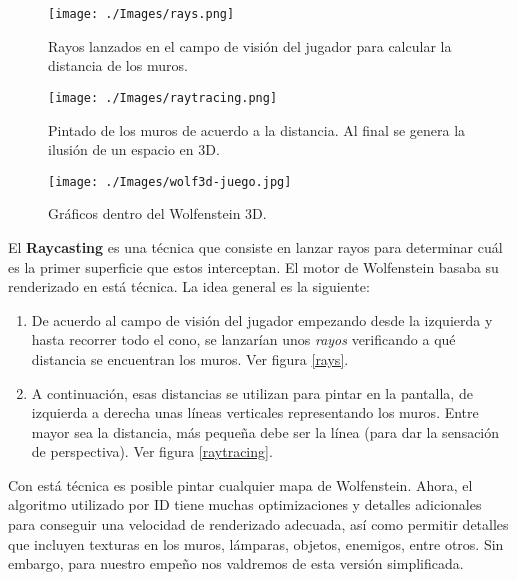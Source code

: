 \begin{wrapfigure}{r}{0.4\textwidth}
	\begin{center}
		\texttt{[image: ./Images/rays.png]}
	\end{center}	
	\caption{Rayos lanzados en el campo de visión del jugador para calcular la distancia de los muros. \newline}
	\label{rays}
	
	\begin{center}
		\texttt{[image: ./Images/raytracing.png]}
	\end{center}	
	\caption{Pintado de los muros de acuerdo a la distancia. Al final se genera la ilusión de un espacio en 3D. \newline}
	\label{raytracing}
	
	\begin{center}
		\texttt{[image: ./Images/wolf3d-juego.jpg]}
	\end{center}
	\caption{Gráficos dentro del Wolfenstein 3D.}
	\label{wolf3d-mapa}

\end{wrapfigure}

El \textbf{Raycasting} es una técnica que consiste en lanzar rayos para determinar cuál es la primer superficie que estos interceptan. El motor de Wolfenstein basaba su renderizado en está técnica. La idea general es la siguiente:

\begin{enumerate}
	\item De acuerdo al campo de visión del jugador empezando desde la izquierda y hasta recorrer todo el cono, se lanzarían unos \emph{rayos} verificando a qué distancia se encuentran los muros. Ver figura \ref{rays}.
	
	\item A continuación, esas distancias se utilizan para pintar en la pantalla, de izquierda a derecha unas líneas verticales representando los muros. Entre mayor sea la distancia, más pequeña debe ser la línea (para dar la sensación de perspectiva). Ver figura \ref{raytracing}.
\end{enumerate}

Con está técnica es posible pintar cualquier mapa de Wolfenstein. Ahora, el algoritmo utilizado por ID tiene muchas optimizaciones y detalles adicionales para conseguir una velocidad de renderizado adecuada, así como permitir detalles que incluyen texturas en los muros, lámparas, objetos, enemigos, entre otros. Sin embargo, para nuestro empeño nos valdremos de esta versión simplificada.

